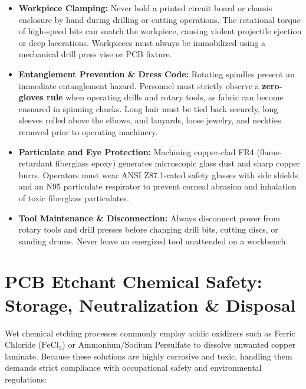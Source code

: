 \begin{itemize}[leftmargin=1.5em]
    \item \textbf{Workpiece Clamping:} Never hold a printed circuit board or chassis enclosure by hand during drilling or cutting operations. The rotational torque of high-speed bits can snatch the workpiece, causing violent projectile ejection or deep lacerations. Workpieces must always be immobilized using a mechanical drill press vise or PCB fixture.
    \item \textbf{Entanglement Prevention \& Dress Code:} Rotating spindles present an immediate entanglement hazard. Personnel must strictly observe a \textbf{zero-gloves rule} when operating drills and rotary tools, as fabric can become ensnared in spinning chucks. Long hair must be tied back securely, long sleeves rolled above the elbows, and lanyards, loose jewelry, and neckties removed prior to operating machinery.
    \item \textbf{Particulate and Eye Protection:} Machining copper-clad FR4 (flame-retardant fiberglass epoxy) generates microscopic glass dust and sharp copper burrs. Operators must wear ANSI Z87.1-rated safety glasses with side shields and an N95 particulate respirator to prevent corneal abrasion and inhalation of toxic fiberglass particulates.
    \item \textbf{Tool Maintenance \& Disconnection:} Always disconnect power from rotary tools and drill presses before changing drill bits, cutting discs, or sanding drums. Never leave an energized tool unattended on a workbench.
\end{itemize}

\section{PCB Etchant Chemical Safety: Storage, Neutralization \& Disposal}
Wet chemical etching processes commonly employ acidic oxidizers such as Ferric Chloride ($\text{FeCl}_3$) or Ammonium/Sodium Persulfate to dissolve unwanted copper laminate. Because these solutions are highly corrosive and toxic, handling them demands strict compliance with occupational safety and environmental regulations:

